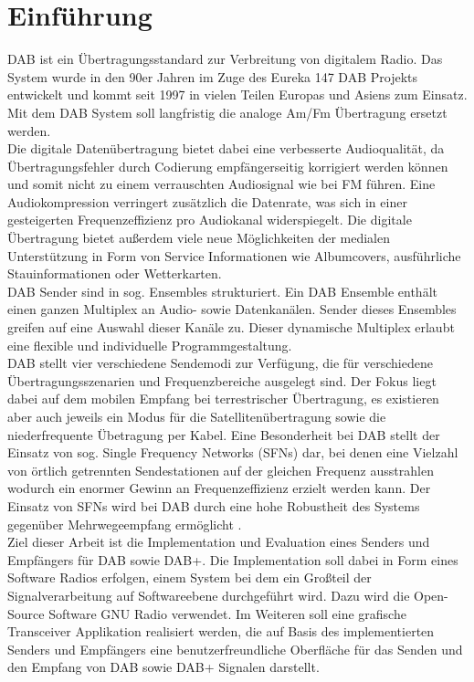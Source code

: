 \chapter{Einführung}
\ac{DAB} ist ein Übertragungsstandard zur Verbreitung von digitalem Radio. Das System wurde in den 90er Jahren im Zuge des Eureka 147 DAB Projekts entwickelt und kommt seit 1997 in vielen Teilen Europas und Asiens zum Einsatz. Mit dem DAB System soll langfristig die analoge Am/Fm Übertragung ersetzt werden.\\
Die digitale Datenübertragung bietet dabei eine verbesserte Audioqualität, da Übertragungsfehler durch Codierung empfängerseitig korrigiert werden können und somit nicht zu einem verrauschten Audiosignal wie bei FM führen. Eine Audiokompression verringert zusätzlich die Datenrate, was sich in einer gesteigerten Frequenzeffizienz pro Audiokanal widerspiegelt. Die digitale Übertragung bietet außerdem viele neue Möglichkeiten der medialen Unterstützung in Form von Service Informationen wie Albumcovers, ausführliche Stauinformationen oder Wetterkarten.\\
DAB Sender sind in sog. Ensembles strukturiert. Ein DAB Ensemble enthält einen ganzen Multiplex an Audio- sowie Datenkanälen. Sender dieses Ensembles greifen auf eine Auswahl dieser Kanäle zu. Dieser dynamische Multiplex erlaubt eine flexible und individuelle Programmgestaltung. \\
DAB stellt vier verschiedene Sendemodi zur Verfügung, die für verschiedene Übertragungsszenarien und Frequenzbereiche ausgelegt sind. Der Fokus liegt dabei auf dem mobilen Empfang bei terrestrischer Übertragung, es existieren aber auch jeweils ein Modus für die Satellitenübertragung sowie die niederfrequente Übetragung per Kabel. Eine Besonderheit bei DAB stellt der Einsatz von sog. Single Frequency Networks (SFNs) dar, bei denen eine Vielzahl von örtlich getrennten Sendestationen auf der gleichen Frequenz ausstrahlen wodurch ein enormer Gewinn an Frequenzeffizienz erzielt werden kann. Der Einsatz von SFNs wird bei DAB durch eine hohe Robustheit des Systems gegenüber Mehrwegeempfang ermöglicht \cite{dab_buch}. \\
Ziel dieser Arbeit ist die Implementation und Evaluation eines Senders und Empfängers für DAB sowie DAB+. Die Implementation soll dabei in Form eines Software Radios erfolgen, einem System bei dem ein Großteil der Signalverarbeitung auf Softwareebene durchgeführt wird. Dazu wird die Open-Source Software GNU Radio verwendet. Im Weiteren soll eine grafische Transceiver Applikation realisiert werden, die auf Basis des implementierten Senders und Empfängers eine benutzerfreundliche Oberfläche für das Senden und den Empfang von DAB sowie DAB+ Signalen darstellt.

